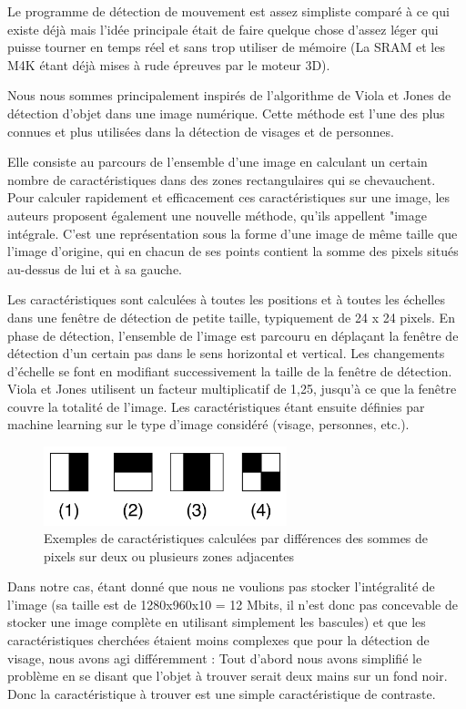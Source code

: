 \documentclass[10pt,a4paper]{report}
\begin{document}
Le programme de détection de mouvement est assez simpliste comparé à ce qui existe déjà mais l'idée principale était de faire quelque chose d'assez léger qui puisse tourner en temps réel et sans trop utiliser de mémoire (La SRAM et les M4K étant déjà mises à rude épreuves par le moteur 3D). 

Nous nous sommes principalement inspirés de l'algorithme de Viola et Jones de détection d'objet dans une image numérique. Cette méthode est l'une des plus connues et plus utilisées dans la détection de visages et de personnes. 

Elle consiste au parcours de l'ensemble d'une image en calculant un certain nombre de caractéristiques dans des zones rectangulaires qui se chevauchent. Pour calculer rapidement et efficacement ces caractéristiques sur une image, les auteurs proposent également une nouvelle méthode, qu'ils appellent "image intégrale. C'est une représentation sous la forme d'une image de même taille que l'image d'origine, qui en chacun de ses points contient la somme des pixels situés au-dessus de lui et à sa gauche.

Les caractéristiques sont calculées à toutes les positions et à toutes les échelles dans une fenêtre de détection de petite taille, typiquement de 24 x 24 pixels. En phase de détection, l'ensemble de l'image est parcouru en déplaçant la fenêtre de détection d'un certain pas dans le sens horizontal et vertical. Les changements d'échelle se font en modifiant successivement la taille de la fenêtre de détection. Viola et Jones utilisent un facteur multiplicatif de 1,25, jusqu'à ce que la fenêtre couvre la totalité de l'image. Les caractéristiques étant ensuite définies par machine learning sur le type d'image considéré (visage, personnes, etc.).\newpage

\begin{figure}
\centering
\includegraphics[width=200pt]{gfx/caract_VJ.png}
\caption{Exemples de caractéristiques calculées par différences des sommes de pixels sur deux ou plusieurs zones adjacentes}
\label{VJ}
\end{figure}

Dans notre cas, étant donné que nous ne voulions pas stocker l'intégralité de l'image (sa taille est de 1280x960x10 = 12 Mbits, il n'est donc pas concevable de stocker une image complète en utilisant simplement les bascules) et que les caractéristiques cherchées étaient moins complexes que pour la détection de visage, nous avons agi différemment : Tout d'abord nous avons simplifié le problème en se disant que l'objet à trouver serait deux mains sur un fond noir. Donc la caractéristique à trouver est une simple caractéristique de contraste. 
\end{document}
